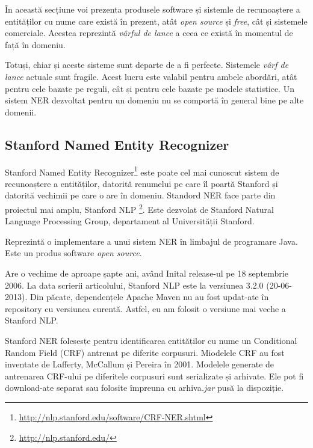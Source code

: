 În această secțiune voi prezenta produsele software și sistemle de recunoaștere a entităților cu nume care există în prezent, atât \textit{open source} și \textit{free}, cât și sistemele comerciale. Acestea reprezintă \textit{vârful de lance} a ceea ce există în momentul de față în domeniu. 

Totuși, chiar și aceste sisteme sunt departe de a fi perfecte. Sistemele \textit{vârf de lance} actuale sunt fragile. Acest lucru este valabil pentru ambele abordări, atât pentru cele bazate pe reguli, cât și pentru cele bazate pe modele statistice. Un sistem NER dezvoltat pentru un domeniu nu se comportă în general bine pe alte domenii.

\subsection{Stanford Named Entity Recognizer}


Stanford Named Entity  Recognizer\footnote{\url{http://nlp.stanford.edu/software/CRF-NER.shtml}} este poate cel mai cunoscut sistem de recunoaștere a entităților, datorită renumelui pe care îl poartă Stanford și datorită vechimii pe care o are în domeniu. Standord NER face parte din proiectul mai amplu, Stanford NLP \footnote{\url{http://nlp.stanford.edu/}}. Este dezvolat de Stanford Natural Language Processing Group, departament al Universității Stanford. 

Reprezintă o implementare a unui sistem NER în limbajul de programare Java. Este un produs software \textit{open source}.

Are o vechime de aproape șapte ani, având Inital release-ul pe 18 septembrie 2006. La data scrierii articolului, Stanford NLP este la versiunea 3.2.0 (20-06-2013). Din păcate, dependențele Apache Maven nu au fost updat-ate în repository cu versiunea curentă. Astfel, eu am folosit o versiune mai veche a Stanford NLP.


Stanford NER folesesțe pentru identificarea entităților cu nume un Conditional Random Field (CRF) antrenat pe diferite corpusuri. Miodelele CRF au fost inventate de Lafferty, McCallum și Pereira în 2001.\cite{Lafferty01conditionalrandom} Modelele generate de antrenarea CRF-ului pe diferitele corpusuri sunt serializate și arhivate. Ele pot fi download-ate separat sau folosite împreuna cu arhiva\textit{.jar} pusă la dispoziție.

